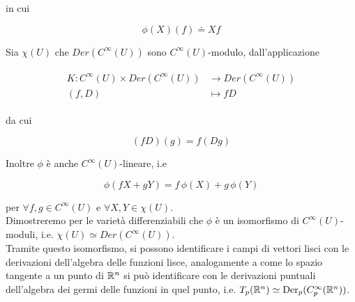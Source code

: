 in cui

\begin{equation}
	\phi(X) (f) \doteq X f
\end{equation}

Sia $ \chi(U) $ che $ Der(C^{\infty}(U)) $ sono $ C^{\infty}(U) $-modulo, dall'applicazione

\begin{align}
	\begin{split}
		K : C^{\infty}(U) \times Der(C^{\infty}(U)) &\to Der(C^{\infty}(U))\\
		(f,D) &\mapsto f D
	\end{split}
\end{align}

da cui

\begin{equation}
	(f D) (g) = f (D g)
\end{equation}

Inoltre $ \phi $ è anche $ C^{\infty}(U) $-lineare, i.e

\begin{equation}
	\phi(f X + g Y) = f \, \phi(X) + g \, \phi(Y)
\end{equation}

per $ \forall f,g \in C^{\infty}(U) $ e $ \forall X,Y \in \chi(U) $.\\
Dimostreremo per le varietà differenziabili che $ \phi $ è un isomorfismo di $ C^{\infty}(U) $-moduli, i.e. $ \chi(U) \simeq Der(C^{\infty}(U)) $.\\
Tramite questo isomorfismo, si possono identificare i campi di vettori lisci con le derivazioni dell'algebra delle funzioni lisce, analogamente a come lo spazio tangente a un punto di $ \mathbb{R}^{n} $ si può identificare con le derivazioni puntuali dell'algebra dei germi delle funzioni in quel punto, i.e. $ T_{p}(\mathbb{R}^{n}) \simeq \operatorname{Der}_{p}(C_{p}^{\infty}(\mathbb{R}^{n})) $.